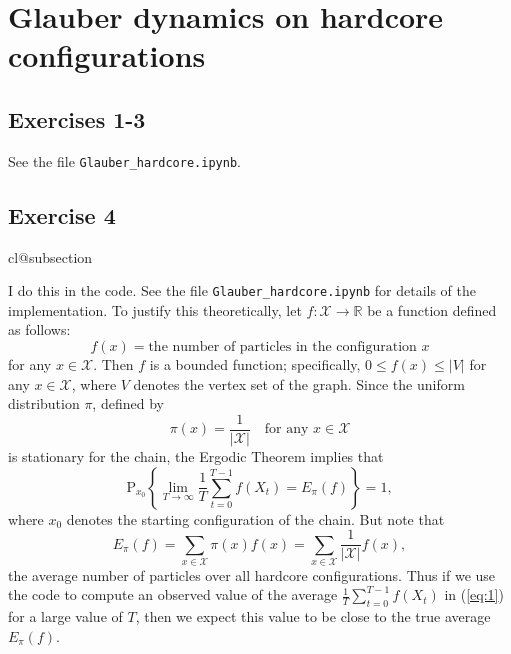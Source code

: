 \documentclass[12pt]{article}
\makeatletter
\def\nullstepcounter#1{%
	\begingroup
		\let\@elt\@stpelt
		\csname cl@#1\endcsname
	\endgroup}
\newcommand{\Prob}{\mathrm{P}}
\makeatother
\begin{document}
\section*{Glauber dynamics on hardcore configurations}

\subsection*{Exercises 1-3}

See the file \texttt{Glauber\_hardcore.ipynb}.

\subsection*{Exercise 4}
\nullstepcounter{subsection}

I do this in the code. See the file \texttt{Glauber\_hardcore.ipynb} for details of the implementation. To justify this theoretically, let $f : \mathcal{X} \to \mathbb{R}$ be a function defined as follows:
\begin{equation*}
f(x) = \text{the number of particles in the configuration $x$}
\end{equation*}
for any $x \in \mathcal{X}$. Then $f$ is a bounded function; specifically, $0 \leq f(x) \leq |V|$ for any $x \in \mathcal{X}$, where $V$ denotes the vertex set of the graph. Since the uniform distribution $\pi$, defined by
\begin{equation*}
\pi(x) = \frac{1}{|\mathcal{X}|} \quad \text{for any $x \in \mathcal{X}$}
\end{equation*}
is stationary for the chain, the Ergodic Theorem implies that
\begin{equation} \label{eq:1}
\Prob_{x_0}\left\{\lim_{T \to \infty} \frac{1}{T} \sum_{t=0}^{T-1} f(X_t) = E_\pi(f) \right\} = 1,
\end{equation}
where $x_0$ denotes the starting configuration of the chain. But note that
\begin{equation*}
E_\pi(f) = \sum_{x \in \mathcal{X}} \pi(x) f(x) = \sum_{x \in \mathcal{X}} \frac{1}{|\mathcal{X}|} f(x),
\end{equation*}
the average number of particles over all hardcore configurations. Thus if we use the code to compute an observed value of the average $\frac{1}{T} \sum_{t=0}^{T-1} f(X_t)$ in (\ref{eq:1}) for a large value of $T$, then we expect this value to be close to the true average $E_\pi(f)$.
\end{document}
